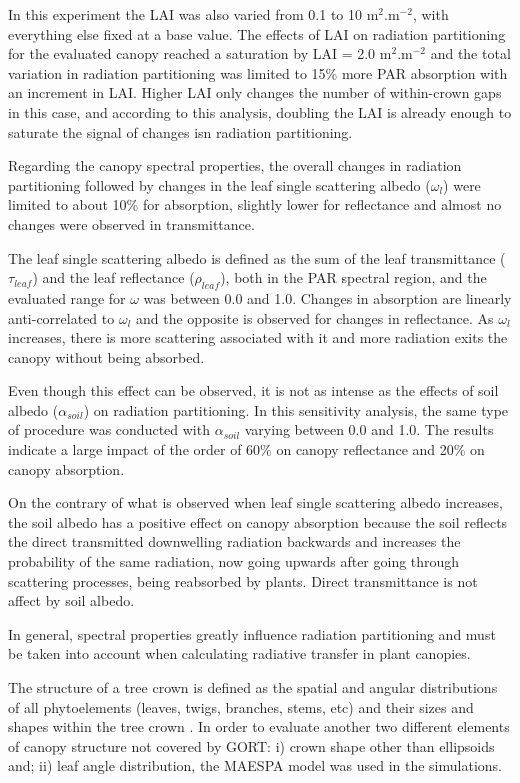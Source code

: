 \documentclass[a4paper,11pt]{report}
\begin{document}
In this experiment the LAI was also varied from 0.1 to 10 m$^2$.m$^{-2}$, with everything else fixed at a base value. The effects of LAI on radiation partitioning for the evaluated canopy reached a saturation by LAI = 2.0 m$^2$.m$^{-2}$ and the total variation in radiation partitioning was limited to 15\% more PAR absorption with an increment in LAI. Higher LAI only changes the number of within-crown gaps in this case, and according to this analysis, doubling the LAI is already enough to saturate the signal of changes isn radiation partitioning. 

Regarding the canopy spectral properties, the overall changes in radiation partitioning followed by changes in the leaf single scattering albedo ($\omega_l$) were limited to about 10\% for absorption, slightly lower for reflectance and almost no changes were observed in transmittance. 

The leaf single scattering albedo is defined as the sum of the leaf transmittance ($\tau_{leaf}$) and the leaf reflectance ($\rho_{leaf}$), both in the PAR spectral region, and the evaluated range for $\omega$ was between 0.0 and 1.0. Changes in absorption are linearly anti-correlated to $\omega_l$ and the opposite is observed for changes in reflectance. As $\omega_l$ increases, there is more scattering associated with it and more radiation exits the canopy without being absorbed. 

Even though this effect can be observed, it is not as intense as the effects of soil albedo ($\alpha_{soil}$) on radiation partitioning. In this sensitivity analysis, the same type of procedure was conducted with $\alpha_{soil}$ varying between 0.0 and 1.0. The results indicate a large impact of the order of 60\% on canopy reflectance and 20\% on canopy absorption. 

On the contrary of what is observed when leaf single scattering albedo increases, the soil albedo has a positive effect on canopy absorption because the soil reflects the direct transmitted downwelling radiation backwards and increases the probability of the same radiation, now going upwards after going through scattering processes, being reabsorbed by plants. Direct transmittance is not affect by soil albedo.

In general, spectral properties greatly influence radiation partitioning and must be taken into account when calculating radiative transfer in plant canopies.

The structure of a tree crown is defined as the spatial and angular distributions of all phytoelements (leaves, twigs, branches, stems, etc) and their sizes and shapes within the tree crown \citep{Wang1990a}. In order to evaluate another two different elements of canopy structure not covered by GORT: i) crown shape other than ellipsoids and; ii) leaf angle distribution, the MAESPA model was used in the simulations. 
\end{document}
